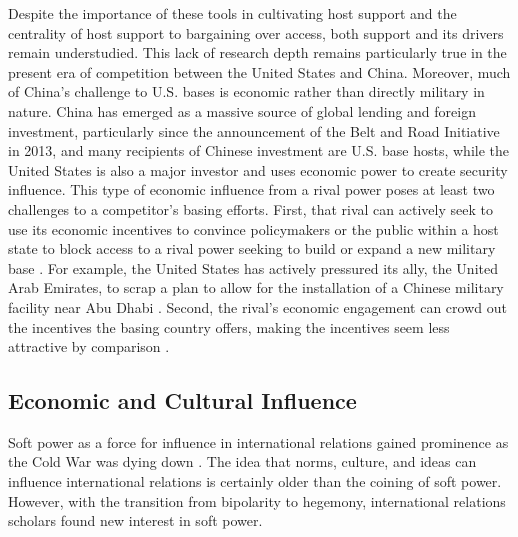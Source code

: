 Despite the importance of these tools in cultivating host support and the centrality of host support to bargaining over access, both support and its drivers remain understudied. This lack of research depth remains particularly true in the present era of competition between the United States and China. Moreover, much of China's challenge to U.S. bases is economic rather than directly military in nature. China has emerged as a massive source of global lending and foreign investment, particularly since the announcement of the Belt and Road Initiative in 2013, and many recipients of Chinese investment are U.S. base hosts, while the United States is also a major investor and uses economic power to create security influence. This type of economic influence from a rival power poses at least two challenges to a competitor's basing efforts. First, that rival can actively seek to use its economic incentives to convince policymakers or the public within a host state to block access to a rival power seeking to build or expand a new military base \cite{joyce2023}. For example, the United States has actively pressured its ally, the United Arab Emirates, to scrap a plan to allow for the installation of a Chinese military facility near Abu Dhabi \cite{hudson2023}. Second, the rival's economic engagement can crowd out the incentives the basing country offers, making the incentives seem less attractive by comparison \cite{joyce2023}.

\subsection*{Economic and Cultural Influence}

Soft power as a force for influence in international relations gained prominence as the Cold War was dying down \cite{nye1990}. The idea that norms, culture, and ideas can influence international relations is certainly older than the coining of soft power. However, with the transition from bipolarity to hegemony, international relations scholars found new interest in soft power. 

